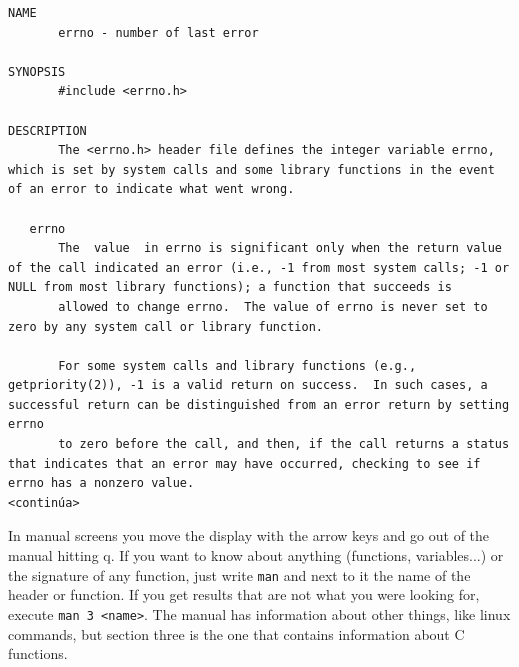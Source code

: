 \documentclass[a4paper]{article}
\begin{document}
\noindent
\begin{minipage}[H]{\linewidth}
\mbox{}
\begin{lstlisting}[style=terminalStyle]
NAME
       errno - number of last error

SYNOPSIS
       #include <errno.h>

DESCRIPTION
       The <errno.h> header file defines the integer variable errno, which is set by system calls and some library functions in the event of an error to indicate what went wrong.

   errno
       The  value  in errno is significant only when the return value of the call indicated an error (i.e., -1 from most system calls; -1 or NULL from most library functions); a function that succeeds is
       allowed to change errno.  The value of errno is never set to zero by any system call or library function.

       For some system calls and library functions (e.g., getpriority(2)), -1 is a valid return on success.  In such cases, a successful return can be distinguished from an error return by setting  errno
       to zero before the call, and then, if the call returns a status that indicates that an error may have occurred, checking to see if errno has a nonzero value.
<continúa>
\end{lstlisting}
\end{minipage}

In manual screens you move the display with the arrow keys and go out of the
manual hitting q. If you want to know about anything (functions, variables...)
or the signature of any function, just write \verb!man! and next to it
the name of the header or function. If you get results that are not what you
were looking for, execute \verb!man 3 <name>!. The manual has information about
other things, like linux commands, but section three is the one that contains
information about C functions.
\end{document}
